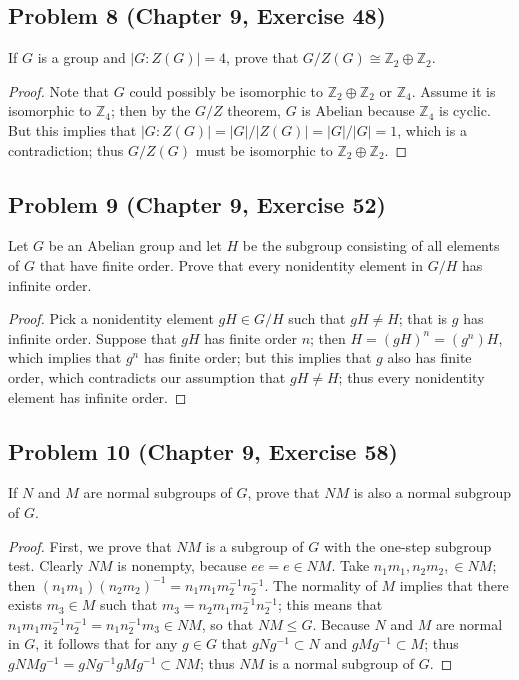 \documentclass{article}
\begin{document}
\subsection*{Problem 8 (Chapter 9, Exercise 48)}
If $G$ is a group and $|G\colon Z(G)| = 4$, prove that $G/Z(G) \cong \mathbb{Z}_2 \oplus \mathbb{Z}_2$.
\begin{proof}
Note that $G$ could possibly be isomorphic to $\mathbb{Z}_2 \oplus \mathbb{Z}_2$ or $\mathbb{Z}_4$. Assume it is isomorphic to $\mathbb{Z}_4$; then by the $G/Z$ theorem, $G$ is Abelian because $\mathbb{Z}_4$ is cyclic. But this implies that $|G\colon Z(G)| = |G| / |Z(G)| = |G| / |G| = 1$, which is a contradiction; thus $G/Z(G)$ must be isomorphic to $\mathbb{Z}_2 \oplus \mathbb{Z}_2$.
\end{proof}

\subsection*{Problem 9 (Chapter 9, Exercise 52)}
Let $G$ be an Abelian group and let $H$ be the subgroup consisting of all elements of $G$ that have finite order. Prove that every nonidentity element in $G/H$ has infinite order.
\begin{proof} 
Pick a nonidentity element $gH \in G/H$ such that $gH \neq H$; that is $g$ has infinite order. Suppose that $gH$ has finite order $n$; then $H = (gH)^n = (g^n)H$, which implies that $g^n$ has finite order; but this implies that $g$ also has finite order, which contradicts our assumption that $gH \neq H$; thus every nonidentity element has infinite order.
\end{proof}

\subsection*{Problem 10 (Chapter 9, Exercise 58)}
If $N$ and $M$ are normal subgroups of $G$, prove that $NM$ is also a normal subgroup of $G$.
\begin{proof}
First, we prove that $NM$ is a subgroup of $G$ with the one-step subgroup test. Clearly $NM$ is nonempty, because $ee = e \in NM$. Take $n_1m_1, n_2m_2, \in NM$; then $(n_1m_1)(n_2m_2)^{-1} = n_1m_1m_2^{-1}n_2^{-1}$. The normality of $M$ implies that there exists $m_3 \in M$ such that $m_3 = n_2m_1m_2^{-1}n_2^{-1}$; this means that $n_1m_1m_2^{-1}n_2^{-1} = n_1n_2^{-1}m_3 \in NM$, so that $NM \leq G$. Because $N$ and $M$ are normal in $G$, it follows that for any $g \in G$ that $gNg^{-1} \subset N$ and $gMg^{-1} \subset M$; thus $gNMg^{-1} = gNg^{-1}gMg^{-1} \subset NM$; thus $NM$ is a normal subgroup of $G$.
\end{proof}
\end{document}
